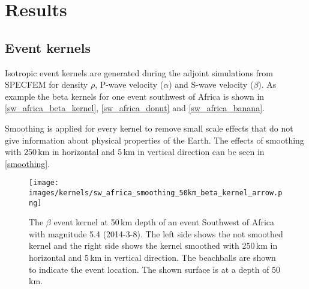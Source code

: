 
\chapter{Results}

\section{Event kernels}

Isotropic event kernels are generated during the adjoint simulations from SPECFEM for density $\rho$, P-wave velocity ($\alpha$) 
and S-wave velocity ($\beta$). As example the beta kernels for one event southwest of Africa is shown in \autoref{sw_africa_beta_kernel},
\autoref{sw_africa_donut} and \autoref{sw_africa_banana}.

Smoothing is applied for every kernel to remove small scale effects that do not give information about physical 
properties of the Earth.
The effects of smoothing with 250$\,$km in horizontal and 5$\,$km in vertical direction can be seen
in \autoref{smoothing}.

\begin{figure}[h]
\begin{center}
\texttt{[image: images/kernels/sw\_africa\_smoothing\_50km\_beta\_kernel\_arrow.png]}
\caption[Effects of smoothing on an event kernel]
{The $\beta$ event kernel at 50$\,$km depth of an event 
Southwest of Africa with magnitude 5.4 (2014-3-8).
The left side shows the not smoothed kernel and the
right side shows the kernel smoothed with 250$\,$km in 
horizontal and 5$\,$km in vertical direction.
The beachballs are shown to indicate the event location.
The shown surface is at a depth of 50$\,$km.}  
\label{smoothing}
\end{center}
\end{figure}






